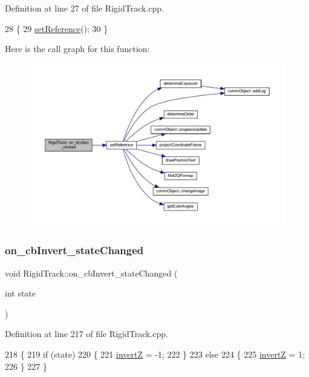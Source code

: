 Definition at line 27 of file Rigid\+Track.\+cpp.


\begin{DoxyCode}
28 \{
29     \hyperlink{main_8cpp_a1e6662e0f16887fe97c7bebe05065972}{setReference}();
30 \}
\end{DoxyCode}
Here is the call graph for this function\+:
\nopagebreak
\begin{figure}[H]
\begin{center}
\leavevmode
\includegraphics[width=350pt]{class_rigid_track_afb1a4edcacc818db4ec6bb017dd07e0f_cgraph}
\end{center}
\end{figure}
\mbox{\label{class_rigid_track_ab347b3edeca55685f4d601549596d44a}} 
\subsubsection{\texorpdfstring{on\+\_\+cb\+Invert\+\_\+state\+Changed}{on\_cbInvert\_stateChanged}}
{\footnotesize\ttfamily void Rigid\+Track\+::on\+\_\+cb\+Invert\+\_\+state\+Changed (\begin{DoxyParamCaption}\item[{int}]{state }\end{DoxyParamCaption})\hspace{0.3cm}{\ttfamily [slot]}}



Definition at line 217 of file Rigid\+Track.\+cpp.


\begin{DoxyCode}
218 \{
219     \textcolor{keywordflow}{if} (state)
220     \{
221         \hyperlink{main_8cpp_a5cc3bd09f5801804b7ae65846e0b9824}{invertZ} = -1;
222     \}
223     \textcolor{keywordflow}{else}
224     \{
225         \hyperlink{main_8cpp_a5cc3bd09f5801804b7ae65846e0b9824}{invertZ} = 1;
226     \}
227 \}
\end{DoxyCode}
\mbox{\label{class_rigid_track_ad6ba1cfe25f18ff0d9f5993aafa36d16}} 
